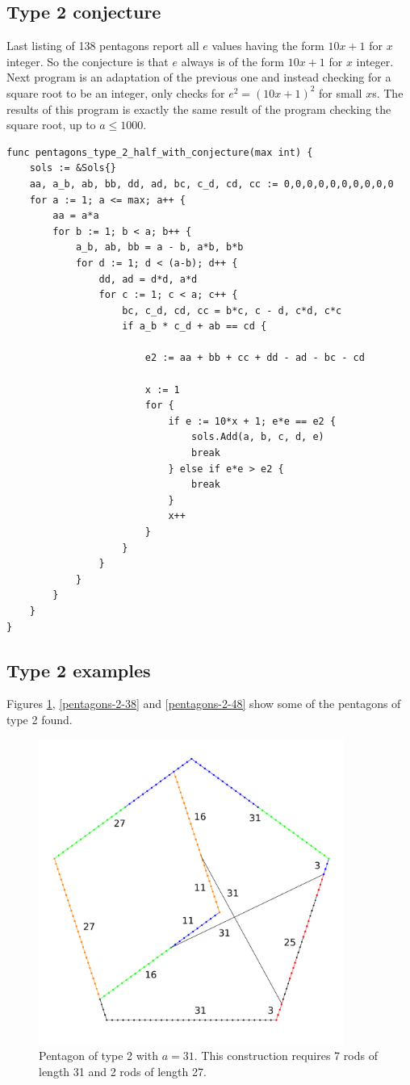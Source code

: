 \documentclass[11pt]{article}
\begin{document}
\subsection{Type 2 conjecture}
Last listing of 138 pentagons report all $e$ values having the form $10x + 1$ for $x$ integer.
So the conjecture is that $e$ always is of the form $10x + 1$ for $x$ integer. Next program
is an adaptation of the previous one and instead checking for a square root to be an integer,
only checks for $e^2 = (10x+1)^2$ for small $x$s. The results of this program is exactly the same result of the
program checking the square root, up to $a \leq 1000$.
\begin{lstlisting}
func pentagons_type_2_half_with_conjecture(max int) {
	sols := &Sols{}
	aa, a_b, ab, bb, dd, ad, bc, c_d, cd, cc := 0,0,0,0,0,0,0,0,0,0
	for a := 1; a <= max; a++ {
		aa = a*a
		for b := 1; b < a; b++ {
			a_b, ab, bb = a - b, a*b, b*b
			for d := 1; d < (a-b); d++ {
				dd, ad = d*d, a*d
				for c := 1; c < a; c++ {
					bc, c_d, cd, cc = b*c, c - d, c*d, c*c
					if a_b * c_d + ab == cd {

						e2 := aa + bb + cc + dd - ad - bc - cd

						x := 1
						for {
							if e := 10*x + 1; e*e == e2 {
								sols.Add(a, b, c, d, e)
								break
							} else if e*e > e2 {
								break
							}
							x++
						}
					}
				}
			}
		}
	}
}

\end{lstlisting} 

\subsection{Type 2 examples}

Figures \ref{pentagons-2-31}, \ref{pentagons-2-38} and \ref{pentagons-2-48} show some of the pentagons of type 2 found.

\begin{figure}
\centering
\includegraphics[width=10cm]{figs/pentagons-2-31}
\caption{Pentagon of type 2 with $a=31$. This construction requires 7 rods of 
length 31 and 2 rods of length 27.}
\label{pentagons-2-31}
\end{figure}
\end{document}
